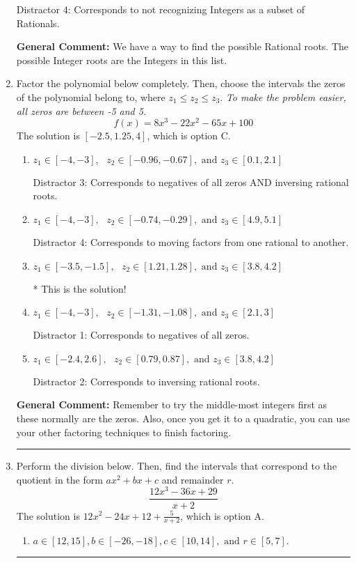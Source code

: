 \documentclass{extbook}[14pt]
\newcommand{\litem}[1]{\item #1

\rule{\textwidth}{0.4pt}}
\begin{document}
\begin{enumerate}
{\begin{enumerate}[label=\Alph*.]
 Distractor 4: Corresponds to not recognizing Integers as a subset of Rationals.
\end{enumerate}

\textbf{General Comment:} We have a way to find the possible Rational roots. The possible Integer roots are the Integers in this list.
}
\litem{
Factor the polynomial below completely. Then, choose the intervals the zeros of the polynomial belong to, where $z_1 \leq z_2 \leq z_3$. \textit{To make the problem easier, all zeros are between -5 and 5.}
\[ f(x) = 8x^{3} -22 x^{2} -65 x + 100 \]The solution is \( [-2.5, 1.25, 4] \), which is option C.\begin{enumerate}[label=\Alph*.]
\item \( z_1 \in [-4, -3], \text{   }  z_2 \in [-0.96, -0.67], \text{   and   } z_3 \in [0.1, 2.1] \)

 Distractor 3: Corresponds to negatives of all zeros AND inversing rational roots.
\item \( z_1 \in [-4, -3], \text{   }  z_2 \in [-0.74, -0.29], \text{   and   } z_3 \in [4.9, 5.1] \)

 Distractor 4: Corresponds to moving factors from one rational to another.
\item \( z_1 \in [-3.5, -1.5], \text{   }  z_2 \in [1.21, 1.28], \text{   and   } z_3 \in [3.8, 4.2] \)

* This is the solution!
\item \( z_1 \in [-4, -3], \text{   }  z_2 \in [-1.31, -1.08], \text{   and   } z_3 \in [2.1, 3] \)

 Distractor 1: Corresponds to negatives of all zeros.
\item \( z_1 \in [-2.4, 2.6], \text{   }  z_2 \in [0.79, 0.87], \text{   and   } z_3 \in [3.8, 4.2] \)

 Distractor 2: Corresponds to inversing rational roots.
\end{enumerate}

\textbf{General Comment:} Remember to try the middle-most integers first as these normally are the zeros. Also, once you get it to a quadratic, you can use your other factoring techniques to finish factoring.
}
\litem{
Perform the division below. Then, find the intervals that correspond to the quotient in the form $ax^2+bx+c$ and remainder $r$.
\[ \frac{12x^{3} -36 x + 29}{x + 2} \]The solution is \( 12x^{2} -24 x + 12 + \frac{5}{x + 2} \), which is option A.\begin{enumerate}[label=\Alph*.]
\item \( a \in [12, 15], b \in [-26, -18], c \in [10, 14], \text{ and } r \in [5, 7]. \)


\end{enumerate}}
\end{enumerate}
\end{document}
